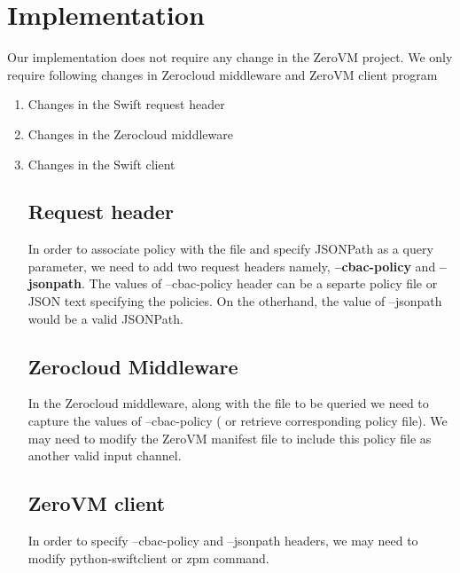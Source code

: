 \section { Implementation}

Our implementation does not require any change in the ZeroVM project. We only require following changes in Zerocloud middleware and ZeroVM client program

\begin{enumerate}
\item Changes in the Swift request header
\item Changes in the Zerocloud middleware
\item Changes in the Swift client


\subsection{Request header}
In order to associate policy with the file and specify JSONPath as a query parameter, we need to add two request headers namely, \textbf{--cbac-policy} and \textbf{--jsonpath}.  The values of --cbac-policy header can be a separte policy file or  JSON text specifying the policies. On the otherhand, the value of --jsonpath would be a valid JSONPath. 

\subsection{Zerocloud Middleware}
In the Zerocloud middleware, along with the file to be queried we  need to capture the values of --cbac-policy ( or retrieve corresponding policy file). We may need to modify the ZeroVM manifest file to include this policy file as another valid input channel. 

\subsection{ZeroVM client}

In order to specify --cbac-policy and --jsonpath headers, we may need to modify python-swiftclient or zpm command.

\end{enumerate}
